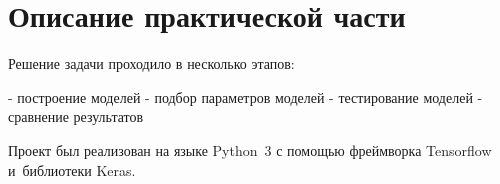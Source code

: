 \section{Описание практической части}

Решение задачи проходило в несколько этапов:

- построение моделей 
- подбор параметров моделей
- тестирование моделей
- сравнение результатов

Проект был реализован на языке Python~3 с помощью фреймворка Tensorflow и~библиотеки Keras.
